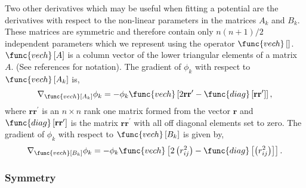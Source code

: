 \documentclass[12pt,thmsa]{article}
\begin{document}
Two other derivatives which may be useful when fitting a potential are the
derivatives with respect to the non-linear parameters in the matrices $A_k$
and $B_k$. These matrices are symmetric and therefore contain only $n\left(
n+1\right) /2$ independent parameters which we represent using the operator $%
\func{vech}\left[ {}\right] $. $\func{vech}\left[ A\right] $ is a column
vector of the lower triangular elements of a matrix $A.$ (See references for
notation\cite{Kinghorn95a,Kinghorn95b}). The gradient of $\phi _k$ with
respect to $\func{vech}\left[ A_k\right] $ is, 
\begin{equation}
\nabla _{\func{vech}\left[ A_k\right] }\phi _k=-\phi _k\func{vech}\left[ 2%
\mathbf{rr}^{\prime }-\func{diag}\left[ \mathbf{rr}^{\prime }\right] \right]
,
\end{equation}
where $\mathbf{rr}^{\prime }$ is an $n\times n$ rank one matrix formed from
the vector $\mathbf{r}$ and $\func{diag}\left[ \mathbf{rr}^{\prime }\right] $
is the matrix $\mathbf{rr}^{\prime }$ with all off diagonal elements set to
zero. The gradient of $\phi _k$ with respect to $\func{vech}\left[ B_k\right]
$ is given by, 
\begin{equation}
\nabla _{\func{vech}\left[ B_k\right] }\phi _k=-\phi _k\func{vech}\left[
2\left( r_{ij}^2\right) -\func{diag}\left[ \left( r_{ij}^2\right) \right] %
\right] .
\end{equation}

\subsubsection{Symmetry}
\end{document}

